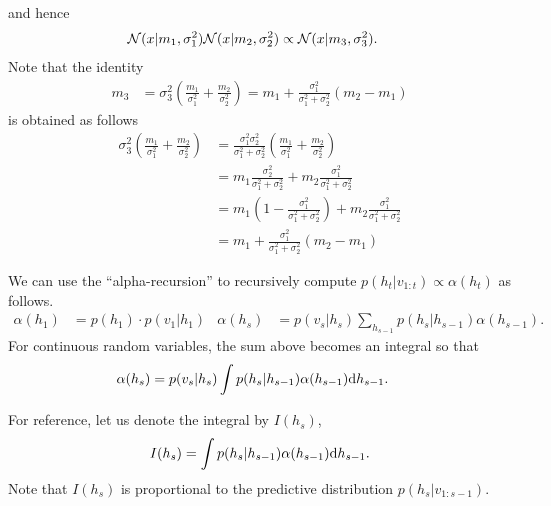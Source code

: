 \begin{exenumerate}
\begin{solution}
    and hence
    \begin{align}
     \mathcal{N}(x | m_1, \sigma_1^2) \mathcal{N}(x | m_2, \sigma_2^2) & \propto  \mathcal{N}(x | m_3, \sigma_3^2).
    \end{align}
    Note that the identity
    \begin{align}
      m_3 & = \sigma_3^2\left( \frac{m_1}{\sigma_1^2}+ \frac{m_2}{\sigma_2^2}\right) = m_1 + \frac{\sigma_1^2}{\sigma_1^2+\sigma_2^2}(m_2-m_1)
    \end{align}
    is obtained as follows
    \begin{align}
      \sigma_3^2\left( \frac{m_1}{\sigma_1^2}+ \frac{m_2}{\sigma_2^2}\right) & =  \frac{\sigma_1^2 \sigma_2^2}{\sigma_1^2+\sigma_2^2}\left( \frac{m_1}{\sigma_1^2}+ \frac{m_2}{\sigma_2^2}\right)\\
      & =  m_1 \frac{\sigma_2^2}{\sigma_1^2+\sigma_2^2}+ m_2 \frac{\sigma_1^2}{\sigma_1^2+\sigma_2^2}\\
      & = m_1 \left(1- \frac{\sigma_1^2}{\sigma_1^2+\sigma_2^2}\right) + m_2 \frac{\sigma_1^2}{\sigma_1^2+\sigma_2^2}\\
      & = m_1 + \frac{\sigma_1^2}{\sigma_1^2+\sigma_2^2} (m_2-m_1)
    \end{align}
     
  \end{solution}


\item We can use the ``alpha-recursion'' to recursively compute $p(h_t | v_{1:t}) \propto
  \alpha(h_t)$ as follows.
  \begin{align}
    \alpha(h_1) & = p(h_1) \cdot  p(v_1 | h_1) &
    \alpha(h_s) &=  p(v_s | h_s) \sum_{h_{s-1}} p(h_s | h_{s-1}) \alpha(h_{s-1}).
  \end{align}
  For continuous random variables, the sum above becomes an integral so that
  \begin{align}
    \alpha(h_s) &=  p(v_s | h_s) \int p(h_s | h_{s-1}) \alpha(h_{s-1}) \mathrm{d} h_{s-1}.
    \label{eq:cont-alpha}
  \end{align}

  For reference, let us denote the integral by $I(h_s)$,
  \begin{equation}
    I(h_s) = \int p(h_s | h_{s-1}) \alpha(h_{s-1}) \mathrm{d} h_{s-1}.
    \label{eq:I-def-kalman}
  \end{equation}
  Note that $I(h_s)$ is proportional to the predictive distribution $p(h_s | v_{1:s-1})$.
  

\end{exenumerate}
